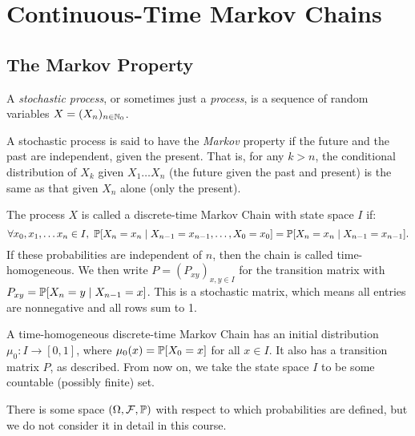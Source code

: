 \documentclass{article}
\begin{document}
\makecover

\section{Continuous-Time Markov Chains}
\subsection{The Markov Property}

A \textit{stochastic process}, or sometimes just a \textit{process}, is a sequence of random variables $X = (X_n)_{\ninn_0}$.

\begin{definition}
    A stochastic process is said to have the \textit{Markov} property if the future and the past are independent, given the present. That is, for any $k > n$, the conditional distribution of $X_k$ given $X_1 \dots X_n$ (the future given the past and present) is the same as that given $X_n$ alone (only the present).
    
    The process $X$ is called a discrete-time Markov Chain with state space $I$ if:
	\[
	\forall x_0, x_1, \dots x_n \in I, \ \P[X_n = x_n \mid X_{n-1} = x_{n-1}, \dots, X_0 = x_0] = \P[X_n = x_n \mid X_{n-1} = x_{n-1}].
	\]
	If these probabilities are independent of $n$, then the chain is called time-homogeneous. We then write $P = (P_{xy})_{x,y\in I}$ for the transition matrix with $P_{xy} = \P[X_n = y \mid X_{n-1} = x]$. This is a stochastic matrix, which means all entries are nonnegative and all rows sum to 1.
\end{definition}

A time-homogeneous discrete-time Markov Chain has an initial distribution $\mu_0 : I \to [0, 1]$, where $\mu_0(x) = \P[X_0 = x]$ for all $x \in I$. It also has a transition matrix $P$, as described. From now on, we take the state space $I$ to be some countable (possibly finite) set.

\begin{note}
	There is some space $(\Omega, \calF, \P)$ with respect to which probabilities are defined, but we do not consider it in detail in this course.
\end{note}
\end{document}
